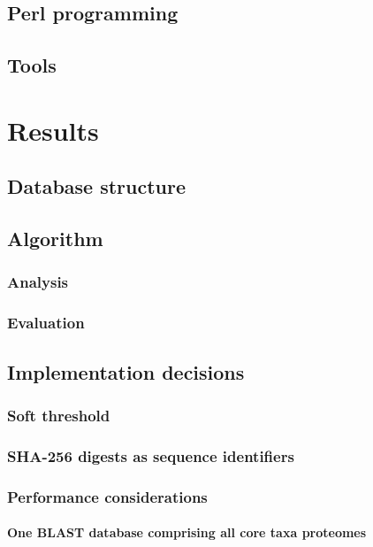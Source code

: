 \documentclass[a4paper,12pt]{scrreprt}
\begin{document}
	\section{Perl programming}
		
	\section{Tools}
		

\chapter{Results}
	
	\section{Database structure}
		
	\section{Algorithm}
		
		\subsection{Analysis}
			
		\subsection{Evaluation}
			
	\section{Implementation decisions}
		\subsection{Soft threshold}
			
		\subsection{SHA-256 digests as sequence identifiers}
			
		\subsection{Performance considerations}
			\subsubsection{One BLAST database comprising all core taxa proteomes}
				
\end{document}
